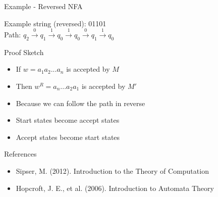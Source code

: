\documentclass{beamer}
\begin{document}
\begin{frame}{Example - Reversed NFA}
\begin{center}
\end{center}
Example string (reversed): 01101 \\
Path: $q_2 \xrightarrow{0} q_1 \xrightarrow{1} q_0 \xrightarrow{1} q_0 \xrightarrow{0} q_1 \xrightarrow{1} q_0$
\end{frame}

\begin{frame}{Proof Sketch}
\begin{itemize}
    \item If $w = a_1a_2...a_n$ is accepted by $M$
    \item Then $w^R = a_n...a_2a_1$ is accepted by $M'$
    \item Because we can follow the path in reverse
    \item Start states become accept states
    \item Accept states become start states
\end{itemize}
\end{frame}

\begin{frame}{References}
\begin{itemize}
    \item Sipser, M. (2012). Introduction to the Theory of Computation
    \item Hopcroft, J. E., et al. (2006). Introduction to Automata Theory
\end{itemize}
\end{frame}
\end{document}
